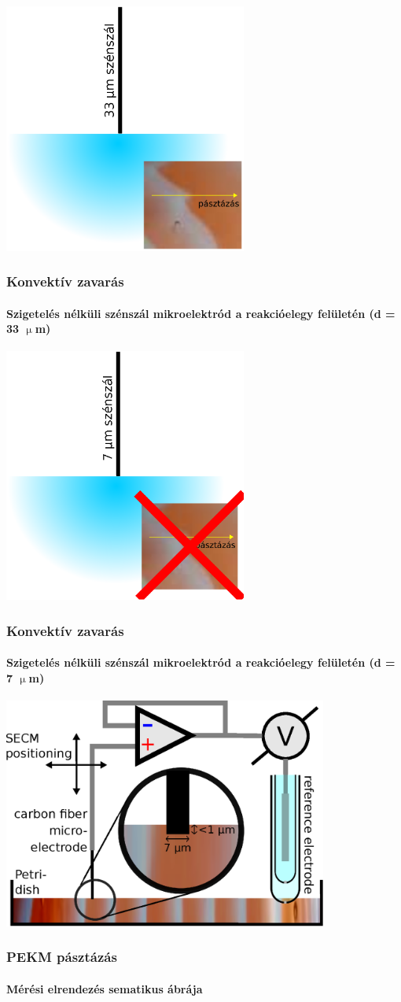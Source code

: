 \documentclass{beamer}
\begin{document}
\begin{frame}
	\centering
	\includegraphics[width=0.6\textwidth]{szigeteles3.eps}
	\frametitle{Konvektív zavarás}
	\framesubtitle{Szigetelés nélküli szénszál mikroelektród a reakcióelegy felületén (d = 33 $\upmu$m)}
\end{frame}

\begin{frame}
	\centering
	\includegraphics[width=0.6\textwidth]{szigeteles4.eps}
	\frametitle{Konvektív zavarás}
	\framesubtitle{Szigetelés nélküli szénszál mikroelektród a reakcióelegy felületén (d = 7 $\upmu$m)}
\end{frame}

\begin{frame}
	\centering
	\includegraphics[width=0.8\textwidth]{setup.eps}
	\frametitle{PEKM pásztázás}
	\framesubtitle{Mérési elrendezés sematikus ábrája}
\end{frame}
\end{document}
